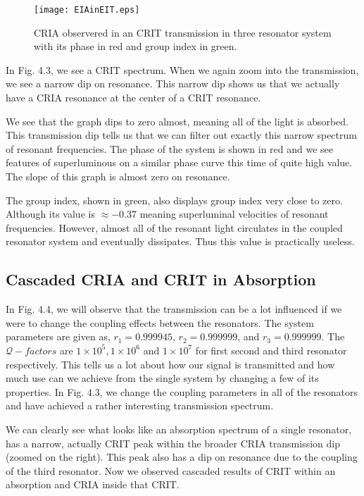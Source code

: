 \begin{figure}[t]
\centering
\texttt{[image: EIAinEIT.eps]}
\caption{CRIA observered in an CRIT transmission in three resonator system with its phase in red and group index in green.}
\end{figure}

In Fig. 4.3, we see a CRIT spectrum. When we again zoom into the transmission, we see a narrow dip on resonance. This narrow dip shows us that we actually have a CRIA resonance at the center of a CRIT resonance.

We see that the graph dips to zero almost, meaning all of the light is absorbed. This transmission dip tells us that we can filter out exactly this narrow spectrum of resonant frequencies. 
The phase of the system is shown in red and we see features of superluminous on a similar phase curve this time of quite high value. The slope of this graph is almost zero on resonance.

The group index, shown in green, also displays group index very close to zero. Although its value is $\approx -0.37$ meaning superluminal velocities of resonant frequencies. However, almost all of the resonant light circulates in the coupled resonator system and eventually dissipates. Thus this value is practically useless.


\subsection{Cascaded CRIA and CRIT in Absorption}
In Fig. 4.4, we will observe that the transmission can be a lot influenced if we were to change the coupling effects between the resonators. The system parameters are given as, $r_{1} = 0.999945$, $r_{2} = 0.999999$, and $r_{3} = 0.999999$. The $\mathcal{Q}-factors$ are $1\times10^{5}, 1\times10^{6}$ and $1\times10^{7}$ for first second and third resonator respectively. This tells us a lot about how our signal is transmitted and how much use can we achieve from the single system by changing a few of its properties. In Fig. 4.3, we change the coupling parameters in all of the resonators and have achieved a rather interesting transmission spectrum.

We can clearly see what looks like an absorption spectrum of a single resonator, has a narrow, actually CRIT peak within the broader CRIA transmission dip (zoomed on the right). This peak also has a dip on resonance due to the coupling of the third resonator. Now we observed cascaded results of CRIT within an absorption and CRIA inside that CRIT. 

